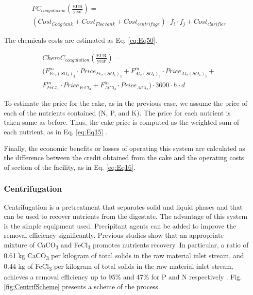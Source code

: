 \begin{refsection}[referencesCh2]
\begin{align}
	& FC_{coagulation} \left( \frac{ \text{EUR} }{\text{year}} \right) = \label{eq:Eq49}\\
	& \left( {Cost}_{Coag \ tank} + {Cost}_{Floc \ tank} + Cost_{centrifuge} \right) \cdot {f_i} \cdot {f_j} + Cost_{clarifier} \nonumber
\end{align}

The chemicals costs are estimated as Eq. \ref{eq:Eq50}.

\begin{align}
	& {ChemC}_{coagulation} \left( \frac{ \text{EUR} }{\text{year}} \right) = \label{eq:Eq50} \\
	& \big( F_{Fe_2 \left(SO_{4} \right)_3}^{in} \cdot Price_{Fe_2 \left( SO_{4} \right)_3} + F_{Al_{2} \left( SO_{4} \right)_3}^{in} \cdot Price_{Al_{2} \left( SO_{4} \right)_3} + \nonumber \\
	& F_{FeCl_{3}}^{in} \cdot Price_{FeCl_{3}} + F_{AlCl_{3}}^{in} \cdot Price_{AlCl_{3}} \big) \cdot 3600\cdot h \cdot d \nonumber
\end{align}

To estimate the price for the cake, as in the previous case, we assume the price of each of the nutrients contained (N, P, and K). The price for each nutrient is taken same as before. Thus, the cake price is computed as the weighted sum of each nutrient, as in Eq. \ref{eq:Eq15} \citep{hernandez2017bio}.

Finally, the economic benefits or losses of operating this system are calculated as the difference between the credit obtained from the cake and the operating costs of section of the facility, as in Eq. \ref{eq:Eq16}.

\subsubsection{Centrifugation}
Centrifugation is a pretreatment that separates solid and liquid phases and that can be used to recover nutrients from the digestate. The advantage of this system is the simple equipment used. Precipitant agents can be added to improve the removal efficiency significantly. Previous studies show that an appropriate mixture of CaCO\textsubscript{3} and FeCl\textsubscript{3} promotes nutrients recovery. In particular, a ratio of 0.61 kg CaCO\textsubscript{3} per kilogram of total solids in the raw material inlet stream, and 0.44 kg of FeCl\textsubscript{3} per kilogram of total solids in the raw material inlet stream, achieves a removal efficiency up to 95\% and 47\% for P and N respectively \citep{meixner2015effect}. Fig. \ref{fig:CentrifScheme} presents a scheme of the process.


\end{refsection}
